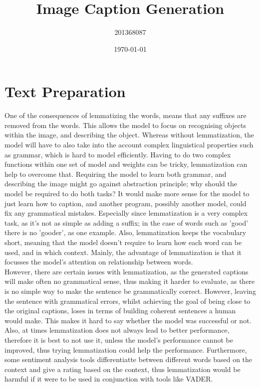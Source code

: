 \documentclass{article}
\author{201368087}
\date{\today}
\title{Image Caption Generation}
\begin{document}
    \maketitle
    \tableofcontents

    \section{Text Preparation}
    One of the consequences of lemmatizing the words, means that any suffixes are removed from the words. This allows the model to focus on recognising objects within the image, and describing the object. Whereas without lemmatization, the model will have to also take into the account complex linguistical properties such as grammar, which is hard to model efficiently. Having to do two complex functions within one set of model and weights can be tricky, lemmatization can help to overcome that. Requiring the model to learn both grammar, and describing the image might go against abstraction principle; why should the model be required to do both tasks? It would make more sense for the model to just learn how to caption, and another program, possibly another model, could fix any grammatical mistakes. Especially since lemmatization is a very complex task, as it's not as simple as adding a suffix; in the case of words such as 'good' there is no 'gooder', as one example. Also, lemmatization keeps the vocabulary short, meaning that the model doesn't require to learn how each word can be used, and in which context. Mainly, the advantage of lemmatization is that it focusses the model's attention on relationship between words.\\
    
    However, there are certain issues with lemmatization, as the generated captions will make often no grammatical sense, thus making it harder to evaluate, as there is no simple way to make the sentence be grammatically correct. However, leaving the sentence with grammatical errors, whilst achieving the goal of being close to the original captions, loses in terms of building coherent sentences a human would make. This makes it hard to say whether the model was successful or not. Also, at times lemmatization does not always lead to better performance, therefore it is best to not use it, unless the model's performance cannot be improved, thus trying lemmatization could help the performance. Furthermore, some sentiment analysis tools differentiatte between different words based on the context and give a rating based on the context, thus lemmatization would be harmful if it were to be used in conjunction with tools like VADER.\\
    
\end{document}
